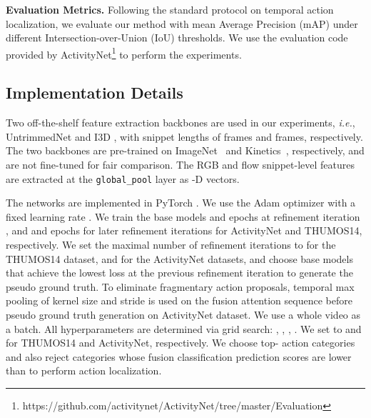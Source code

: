 \documentclass[runningheads]{llncs}
\begin{document}
\noindent\textbf{Evaluation Metrics.} Following the standard protocol on temporal action localization, we evaluate our method with mean Average Precision (mAP) under different Intersection-over-Union (IoU) thresholds. We use the evaluation code provided by ActivityNet\footnote{https://github.com/activitynet/ActivityNet/tree/master/Evaluation} to perform the experiments.

\subsection{Implementation Details}
Two off-the-shelf feature extraction backbones are used in our experiments, \textit{i.e.}, UntrimmedNet \cite{wang2017untrimmednets} and I3D \cite{carreira2017quo}, with snippet lengths of  frames and  frames, respectively. 
The two backbones are pre-trained on ImageNet~\cite{Deng2009ImageNet} and Kinetics~\cite{carreira2017quo}, respectively, and are not fine-tuned for fair comparison.
The RGB and flow snippet-level features are extracted at the \texttt{global\_pool} layer as -D vectors.



The networks are implemented in PyTorch \cite{paszke2017automatic}.
We use the Adam \cite{kingma2014adam} optimizer with a fixed learning rate . 
We train the base models  and  epochs at refinement iteration , and  and  epochs for later refinement iterations for ActivityNet and THUMOS14, respectively.
We set the maximal number of refinement iterations to  for the THUMOS14 dataset, and  for the ActivityNet datasets, and choose base models that achieve the lowest loss at the previous refinement iteration to generate the pseudo ground truth.
To eliminate fragmentary action proposals, temporal max pooling of kernel size  and stride  is used on the fusion attention sequence before pseudo ground truth generation on ActivityNet dataset. 
We use a whole video as a batch.
All hyperparameters are determined via grid search: , , , . We set  to  and  for THUMOS14 and ActivityNet, respectively. We choose top- action categories and also reject categories whose fusion classification prediction scores are lower than  to perform action localization.
\end{document}
